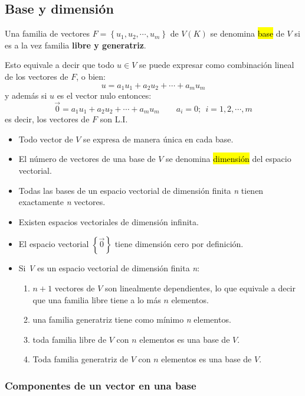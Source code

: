 \subsection{Base y dimensión}

Una familia de vectores \(F = \left\{u_1, u_2, \cdots, u_m\right\}\) de \(V(K)\) se denomina \hl{base} de \(V\) si es a la vez familia \textbf{libre y generatriz}.

Esto equivale a decir que todo \(u \in V\) se puede expresar como combinación lineal de los vectores de \(F\), o bien:
\[
  u = a_1 u_1 + a_2 u _2 + \cdots + a_m u_m
\] 
y además si \(u\) es el vector nulo entonces:
\[
  \vec{0} = a_1 u_1 + a_2 u_2 + \cdots + a_m u_m \qquad a_i = 0; ~~ i=1,2,\cdots,m
\]
es decir, los vectores de \(F\) son L.I.

\begin{itemize}
  \item Todo vector de \(V\) se expresa de manera única en cada base.
  \item El número de vectores de una base de \(V\) se denomina \hl{dimensión} del espacio vectorial.
  \item Todas las bases de un espacio vectorial de dimensión finita \textit{n} tienen exactamente \textit{n} vectores.
  \item Existen espacios vectoriales de dimensión infinita.
  \item El espacio vectorial \(\left\{\vec{0}\right\}\) tiene dimensión cero por definición.
  \item Si \textit{V} es un espacio vectorial de dimensión finita \textit{n}:
  \begin{enumerate}
    \item \(n+1\) vectores de \(V\) son linealmente dependientes, lo que equivale a decir que una familia libre tiene a lo más \(n\) elementos.
    \item una familia generatriz tiene como mínimo \textit{n} elementos.
    \item toda familia libre de \(V\) con \(n\) elementos es una base de \(V\).
    \item Toda familia generatriz de \(V\) con \(n\) elementos es una base de \(V\).
  \end{enumerate}
\end{itemize}

\subsubsection{Componentes de un vector en una base}

